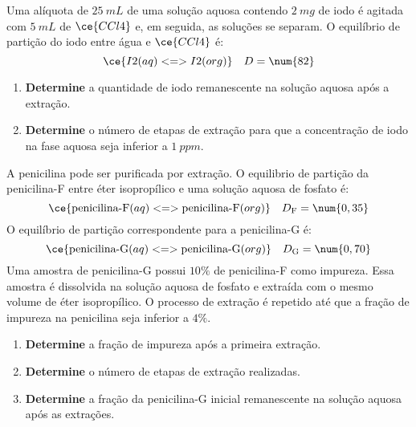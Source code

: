 \begin{problem}[
	id={2F61},
	path={/home/braun/Documents/Developer/braunchem/data/problems/Q2/2F/2F61}
]
Uma alíquota de {\(\qty{25}{\unit{mL}}\)} de uma solução aquosa contendo {\(\qty{2}{\unit{mg}}\)} de iodo é agitada com {\(\qty{5}{\unit{mL}}\)} de
{\(\ce{CCl4}\)} e, em seguida, as soluções se separam. O equilíbrio de partição do iodo entre água e {\(\ce{CCl4}\)} é: {\[
    \ce{ I2(aq) <=> I2(org) } \quad D = \num{82}
\]}

\begin{enumerate}
\def\labelenumi{\alph{enumi}.}
\tightlist
\item
  \textbf{Determine} a quantidade de iodo remanescente na solução aquosa após a extração.
\item
  \textbf{Determine} o número de etapas de extração para que a concentração de iodo na fase aquosa seja inferior a {\(\qty{1}{\unit{ppm}}\)}.
\end{enumerate}

\end{problem}


\begin{problem}[
	id={2F62},
	path={/home/braun/Documents/Developer/braunchem/data/problems/Q2/2F/2F62}
]
A penicilina pode ser purificada por extração. O equilibrio de partição da penicilina-F entre éter isopropílico e uma solução aquosa de fosfato é: {\[
    \ce{ \text{penicilina-F}(aq) <=> \text{penicilina-F}(org) }
\quad D_\mathrm{F} = \num{0,35}
\]} O equilíbrio de partição correspondente para a penicilina-G é: {\[
    \ce{ \text{penicilina-G}(aq) <=> \text{penicilina-G}(org) }
\quad D_\mathrm{G} = \num{0,70}
\]} Uma amostra de penicilina-G possui {\(\num{10}\%\)} de penicilina-F como impureza. Essa amostra é dissolvida na solução aquosa de fosfato e
extraída com o mesmo volume de éter isopropílico. O processo de extração é repetido até que a fração de impureza na penicilina seja inferior a
{\(\num{4}\%\)}.

\begin{enumerate}
\def\labelenumi{\alph{enumi}.}
\tightlist
\item
  \textbf{Determine} a fração de impureza após a primeira extração.
\item
  \textbf{Determine} o número de etapas de extração realizadas.
\item
  \textbf{Determine} a fração da penicilina-G inicial remanescente na solução aquosa após as extrações.
\end{enumerate}

\end{problem}


